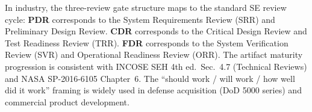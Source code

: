 
\begin{keyconceptbox}
In industry, the three-review gate structure maps to the standard SE review cycle: \textbf{PDR} corresponds to the System Requirements Review (SRR) and Preliminary Design Review. \textbf{CDR} corresponds to the Critical Design Review and Test Readiness Review (TRR). \textbf{FDR} corresponds to the System Verification Review (SVR) and Operational Readiness Review (ORR). The artifact maturity progression is consistent with INCOSE SEH 4th ed.\ Sec.~4.7 (Technical Reviews) and NASA SP-2016-6105 Chapter~6. The ``should work / will work / how well did it work'' framing is widely used in defense acquisition (DoD 5000 series) and commercial product development.
\end{keyconceptbox}

